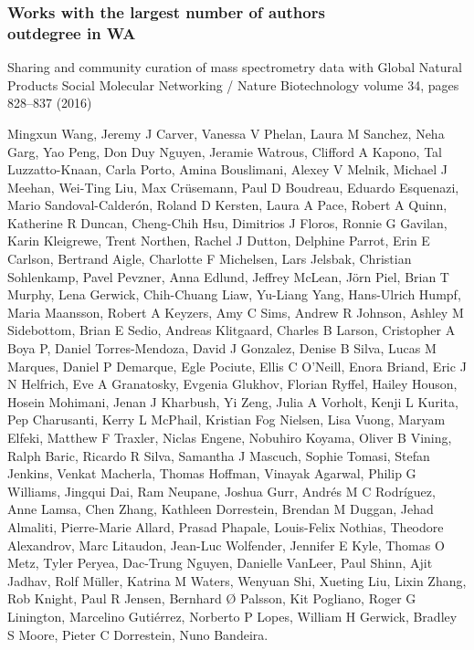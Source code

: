 \documentclass[hyperref={pdfstartview={FitBH -32768},
                         pdfpagemode=FullScreen,
                         plainpages=false,
                         colorlinks=true}
              ]{beamer}
\begin{document}
\begin{frame}[fragile]
\frametitle{Works with the largest number of authors \label{numpap}\\ \normalsize outdegree in WA}

Sharing and community curation of mass spectrometry data with Global Natural Products Social Molecular Networking / Nature Biotechnology volume 34, pages 828–837 (2016)
\medskip

\renewcommand{\arraystretch}{0.82}
\tiny
Mingxun Wang, Jeremy J Carver, Vanessa V Phelan, Laura M Sanchez, Neha Garg, Yao Peng, Don Duy Nguyen, Jeramie Watrous, Clifford A Kapono, Tal Luzzatto-Knaan, Carla Porto, Amina Bouslimani, Alexey V Melnik, Michael J Meehan, Wei-Ting Liu, Max Crüsemann, Paul D Boudreau, Eduardo Esquenazi, Mario Sandoval-Calderón, Roland D Kersten, Laura A Pace, Robert A Quinn, Katherine R Duncan, Cheng-Chih Hsu, Dimitrios J Floros, Ronnie G Gavilan, Karin Kleigrewe, Trent Northen, Rachel J Dutton, Delphine Parrot, Erin E Carlson, Bertrand Aigle, Charlotte F Michelsen, Lars Jelsbak, Christian Sohlenkamp, Pavel Pevzner, Anna Edlund, Jeffrey McLean, Jörn Piel, Brian T Murphy, Lena Gerwick, Chih-Chuang Liaw, Yu-Liang Yang, Hans-Ulrich Humpf, Maria Maansson, Robert A Keyzers, Amy C Sims, Andrew R Johnson, Ashley M Sidebottom, Brian E Sedio, Andreas Klitgaard, Charles B Larson, Cristopher A Boya P, Daniel Torres-Mendoza, David J Gonzalez, Denise B Silva, Lucas M Marques, Daniel P Demarque, Egle Pociute, Ellis C O'Neill, Enora Briand, Eric J N Helfrich, Eve A Granatosky, Evgenia Glukhov, Florian Ryffel, Hailey Houson, Hosein Mohimani, Jenan J Kharbush, Yi Zeng, Julia A Vorholt, Kenji L Kurita, Pep Charusanti, Kerry L McPhail, Kristian Fog Nielsen, Lisa Vuong, Maryam Elfeki, Matthew F Traxler, Niclas Engene, Nobuhiro Koyama, Oliver B Vining, Ralph Baric, Ricardo R Silva, Samantha J Mascuch, Sophie Tomasi, Stefan Jenkins, Venkat Macherla, Thomas Hoffman, Vinayak Agarwal, Philip G Williams, Jingqui Dai, Ram Neupane, Joshua Gurr, Andrés M C Rodríguez, Anne Lamsa, Chen Zhang, Kathleen Dorrestein, Brendan M Duggan, Jehad Almaliti, Pierre-Marie Allard, Prasad Phapale, Louis-Felix Nothias, Theodore Alexandrov, Marc Litaudon, Jean-Luc Wolfender, Jennifer E Kyle, Thomas O Metz, Tyler Peryea, Dac-Trung Nguyen, Danielle VanLeer, Paul Shinn, Ajit Jadhav, Rolf Müller, Katrina M Waters, Wenyuan Shi, Xueting Liu, Lixin Zhang, Rob Knight, Paul R Jensen, Bernhard Ø Palsson, Kit Pogliano, Roger G Linington, Marcelino Gutiérrez, Norberto P Lopes, William H Gerwick, Bradley S Moore, Pieter C Dorrestein, Nuno Bandeira.

\end{frame}
\end{document}
